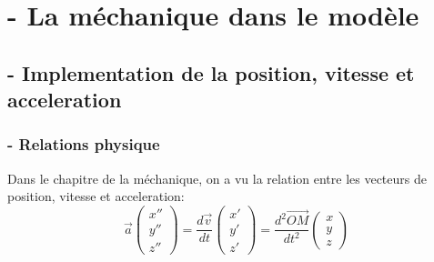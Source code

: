 \documentclass[a4paper, 12pt]{scrartcl}
\begin{document}
\newpage
\section{- La méchanique dans le modèle}
\subsection{- Implementation de la position, vitesse et acceleration}
\subsubsection{- Relations physique}
Dans le chapitre de la méchanique, on a vu la relation entre les vecteurs
de position, vitesse et acceleration:
\\

\[\overrightarrow{a} \begin{pmatrix} x'' \\ y'' \\ z'' \end{pmatrix}
= \frac{d\overrightarrow{v}}{d t} \begin{pmatrix} x' \\ y' \\ z' \end{pmatrix}
= \frac{d^2 \overrightarrow{OM}}{d t^2}\begin{pmatrix} x \\ y \\ z \end{pmatrix}\]
\\
\\
\end{document}
